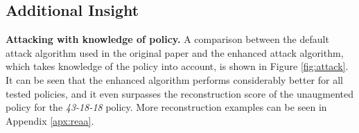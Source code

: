 

\subsection{Additional Insight}
\textbf{Attacking with knowledge of policy.}
A comparison between the default attack algorithm used in the original paper and the enhanced attack algorithm, which takes knowledge of the policy into account, is shown in Figure \ref{fig:attack}. It can be seen that the enhanced algorithm performs considerably better for all tested policies, and it even surpasses the reconstruction score of the unaugmented policy for the \textit{43-18-18} policy. More reconstruction examples can be seen in Appendix \ref{apx:reaa}.


